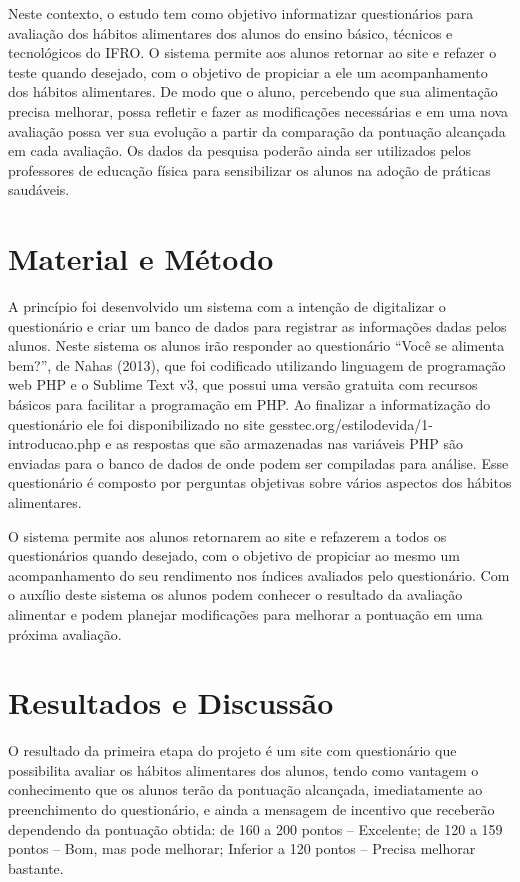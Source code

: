 \documentclass[article,12pt,onesidea,4paper,english,brazil]{abntex2}
\begin{document}
Neste contexto, o estudo tem como objetivo informatizar questionários para avaliação dos hábitos alimentares dos alunos do ensino básico, técnicos e tecnológicos do IFRO. O sistema permite aos alunos retornar ao site e refazer o teste quando desejado, com o objetivo de propiciar a ele um acompanhamento dos hábitos alimentares. De modo que o aluno, percebendo que sua alimentação precisa melhorar, possa refletir e fazer as modificações necessárias e em uma nova avaliação possa ver sua evolução a partir da comparação da pontuação alcançada em cada avaliação. Os dados da pesquisa poderão ainda ser utilizados pelos professores de educação física para sensibilizar os alunos na adoção de práticas saudáveis.
	
	\section*{Material e Método}
	
A princípio foi desenvolvido um sistema com a intenção de digitalizar o questionário e criar um banco de dados para registrar as informações dadas pelos alunos. Neste sistema os alunos irão responder ao questionário “Você se alimenta bem?”, de Nahas (2013), que foi codificado utilizando linguagem de programação web PHP e o Sublime Text v3, que possui uma versão gratuita com recursos básicos para facilitar a programação em PHP. Ao finalizar a informatização do questionário ele foi disponibilizado no site gesstec.org/estilodevida/1-introducao.php e as respostas que são armazenadas nas variáveis PHP são enviadas para o banco de dados de onde podem ser compiladas para análise. Esse questionário é composto por perguntas objetivas sobre vários aspectos dos hábitos alimentares.

O sistema permite aos alunos retornarem ao site e refazerem a todos os questionários quando desejado, com o objetivo de propiciar ao mesmo um acompanhamento do seu rendimento nos índices avaliados pelo questionário. Com  o auxílio deste sistema os alunos podem conhecer o resultado da avaliação alimentar e podem planejar modificações para melhorar a pontuação em uma próxima avaliação.
	
	\section*{Resultados e Discussão}
	
O resultado da primeira etapa do projeto é um site com questionário que possibilita avaliar os hábitos alimentares dos alunos, tendo como vantagem o conhecimento que os alunos terão da pontuação alcançada, imediatamente ao preenchimento do questionário, e ainda a mensagem de incentivo que receberão dependendo da pontuação obtida: de 160 a 200 pontos – Excelente; de 120 a 159 pontos – Bom, mas pode melhorar; Inferior a 120 pontos – Precisa melhorar bastante.
\end{document}
